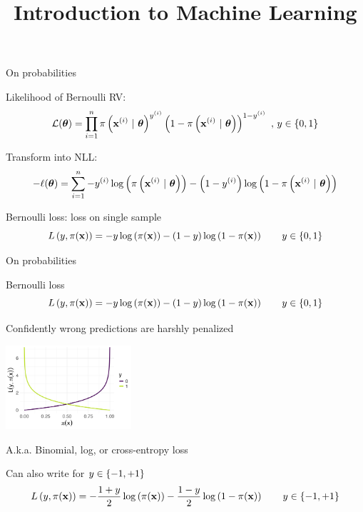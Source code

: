 \documentclass[11pt,compress,t,notes=noshow, xcolor=table]{beamer}
\title{Introduction to Machine Learning}
\begin{document}
    

\begin{vbframe}{On probabilities}
 
\begin{itemizeL}
\item  Likelihood of Bernoulli RV:
$$
\mathcal{L}(\bm{\theta}) = \prod\limits_{i=1}^n \pi\left(\mathbf{x}^{(i)} ~|~ \bm{\theta}\right)^{y^{(i)}} \left(1-\pi\left(\mathbf{x}^{(i)} ~|~ \bm{\theta}\right)\right)^{1-y^{(i)}} \,\,, \, y \in \{0, 1\}
$$
\item Transform into NLL:
$$- \ell(\bm{\theta}) = \sum\limits_{i=1}^n - y^{(i)} \log\left(\pi\left(\mathbf{x}^{(i)} ~|~ \bm{\theta}\right)\right) - \left(1-y^{(i)}\right)\log\left(1-\pi\left(\mathbf{x}^{(i)} ~|~ \bm{\theta}\right)\right)$$
\item Bernoulli loss: loss on single sample
$$
L\left(y, \pi(\mathbf{x})\right) = - y \log \left(\pi(\mathbf{x})\right) - (1 - y) \log \left(1 - \pi(\mathbf{x})\right) \qquad y \in \{0, 1\} 
$$ 
\end{itemizeL}

\end{vbframe}


\begin{vbframe}{On probabilities}
 
\begin{itemizeS}
\item Bernoulli loss
$$
L\left(y, \pi(\mathbf{x})\right) = - y \log \left(\pi(\mathbf{x})\right) - (1 - y) \log \left(1 - \pi(\mathbf{x})\right) \qquad y \in \{0, 1\} 
$$ 
\item Confidently wrong predictions are harshly penalized

\begin{center}
\includegraphics[width=0.35\textwidth]{figure/bernoulli_prob.png}  \end{center}

\item A.k.a. Binomial, log, or cross-entropy loss
\item Can also write for $y \in \{-1, +1\} $
$$
L\left(y, \pi(\mathbf{x})\right)  = - \frac{1 + y}{2} \log\left(\pi(\mathbf{x})\right) - \frac{1 - y}{2} \log\left(1 - \pi(\mathbf{x})\right) \qquad y \in \{-1, +1\} 
$$
\end{itemizeS}

\end{vbframe}
\end{document}
